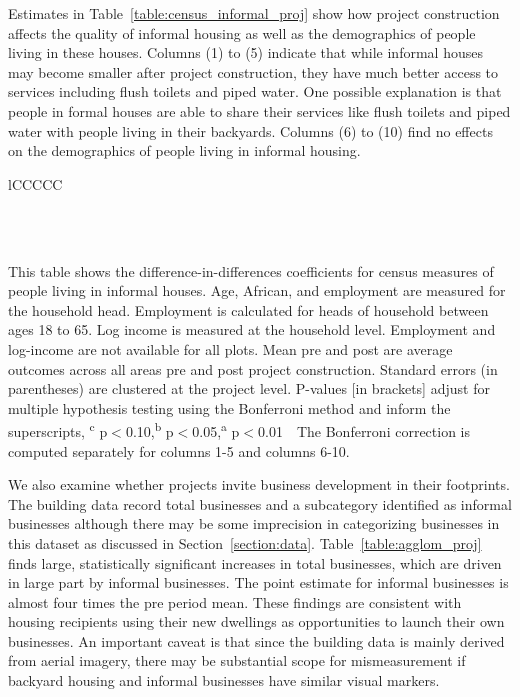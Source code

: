 \documentclass[12pt]{article}
\newcommand{\regtextfirst}{
Mean pre and post are average outcomes across all areas pre and post project construction.  Standard errors (in parentheses) are clustered at the project level.  P-values [in brackets] adjust for multiple hypothesis testing using the Bonferroni method and inform the superscripts, \textsuperscript{c} p$<$0.10,\textsuperscript{b} p$<$0.05,\textsuperscript{a} p$<$0.01 \,\,
}
\newcommand{\rv}{}
\begin{document}
\rv{Estimates in Table~\ref{table:census_informal_proj} show how project construction affects the quality of informal housing as well as the demographics of people living in these houses.  Columns (1) to (5) indicate that while informal houses may become smaller after project construction, they have much better access to services including flush toilets and piped water.  One possible explanation is that people in formal houses are able to share their services like flush toilets and piped water with people living in their backyards.  Columns (6) to (10) find no effects on the demographics of people living in informal housing.}

\begin{table}[h!]
\small
\centering
\caption{Direct Effects on Informal House Quality and Demographics for Inhabitants}\label{table:census_informal_proj} 
\vspace{-2mm}
\begin{threeparttable}
\begin{tabular}{lCCCCC}
\toprule

\\
\\\midrule

\bottomrule
\end{tabular}
\begin{tablenotes}
\item \footnotesize This table shows the difference-in-differences coefficients for census measures of people living in informal houses. Age, African, and employment are measured for the household head.  Employment is calculated for heads of household between ages 18 to 65.  Log income is measured at the household level.  Employment and log-income are not available for all plots.   \regtextfirst The Bonferroni correction is computed separately for columns 1-5 and columns 6-10.
\end{tablenotes}
\end{threeparttable}
\end{table}


\rv{We also examine whether projects invite business development in their footprints.  The building data record total businesses and a subcategory identified as informal businesses although there may be some imprecision in categorizing businesses in this dataset as discussed in Section~\ref{section:data}.  Table~\ref{table:agglom_proj} finds large, statistically significant increases in total businesses, which are driven in large part by informal businesses.  The point estimate for informal businesses is almost four times the pre period mean.  These findings are consistent with housing recipients using their new dwellings as opportunities to launch their own businesses.  An important caveat is that since the building data is mainly derived from aerial imagery, there may be substantial scope for mismeasurement if backyard housing and informal businesses have similar visual markers.}
\end{document}
